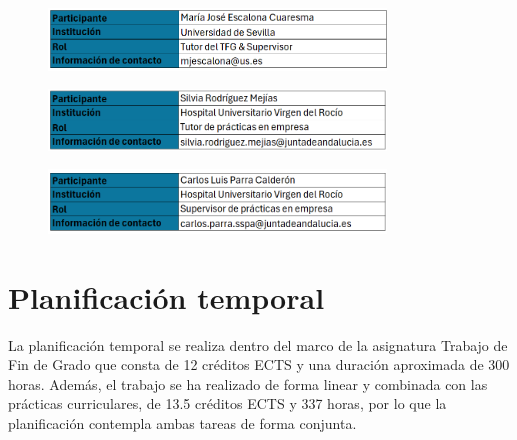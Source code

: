 \begin{figure}[H]
    \centering
    \includegraphics[width=0.80\textwidth]{tables/tercerParticipante.png}
    \label{table:tercerParticipante}
\end{figure}

\begin{figure}[H]
    \centering
    \includegraphics[width=0.80\textwidth]{tables/cuartoParticipante.png}
    \label{table:cuartoParticipante}
\end{figure}

\begin{figure}[H]
    \centering
    \includegraphics[width=0.80\textwidth]{tables/quintoParticipante.png}
    \label{table:quintoParticipante}
\end{figure}

\section{Planificación temporal} \label{sec:03Temporal}

La planificación temporal se realiza dentro del marco de la asignatura Trabajo de Fin de Grado que consta de 12 créditos ECTS y una duración aproximada de 300 horas. Además, el trabajo se ha realizado de forma linear y combinada con las prácticas curriculares, de 13.5 créditos ECTS y 337 horas, por lo que la planificación contempla ambas tareas de forma conjunta.

